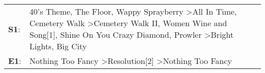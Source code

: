 \begin{supertabular}{p{0.03\textwidth}p{0.92\textwidth}}
 \textbf{S1}:  &  40's Theme\textsuperscript{}, \enspace The Floor\textsuperscript{}, \enspace Wappy Sprayberry\textsuperscript{} \textgreater \enspace All In Time\textsuperscript{}, \enspace Cemetery Walk\textsuperscript{} \textgreater \enspace Cemetery Walk II\textsuperscript{}, \enspace Women Wine and Song[1]\textsuperscript{}, \enspace Shine On You Crazy Diamond\textsuperscript{}, \enspace Prowler\textsuperscript{} \textgreater \enspace Bright Lights, Big City\textsuperscript{}  \enspace  \\
 \textbf{E1}:  &                                                                                                                                                                                                                                                                                                                                   Nothing Too Fancy\textsuperscript{} \textgreater \enspace Resolution[2]\textsuperscript{} \textgreater \enspace Nothing Too Fancy\textsuperscript{}  \enspace  \\
\end{supertabular}

